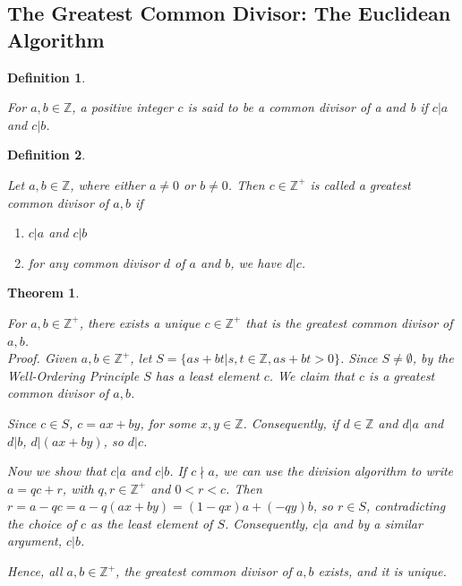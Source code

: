 \documentclass[12pt]{article}
\newtheorem{definition}{Definition} [section]
\newtheorem{theorem}{Theorem} [section]
\begin{document}
\subsection{The Greatest Common Divisor: The Euclidean Algorithm}
\begin{definition}
\begin{em}
For $a, b \in \mathbb{Z}$, a positive integer $c$ is said to be a \emph{common divisor of a and b} if $c|a$ and $c|b$.
\end{em}
\end{definition}
\begin{definition}
\begin{em}
Let $a, b \in \mathbb{Z}$, where either $a \neq 0$ or $b \neq 0$. Then $c \in \mathbb{Z}^+$ is called a \emph{greatest common divisor} of $a, b$ if
\begin{enumerate}
\item $c|a$ and $c|b$
\item for any common divisor $d$ of $a$ and $b$, we have $d|c$.
\end{enumerate}
\end{em}
\end{definition}
\begin{theorem}
\begin{em}
For $a, b \in \mathbb{Z}^+$, there exists a unique $c \in \mathbb{Z}^+$ that is \emph{the} greatest common divisor of $a, b$.\\
\emph{Proof.} Given $a, b \in \mathbb{Z}^+$, let $S = \{as + bt | s, t \in \mathbb{Z}, as + bt > 0\}$. Since $S \neq \emptyset$, by the Well-Ordering Principle $S$ has a least element $c$. We claim that $c$ is a greatest common divisor of $a, b$.

Since $c \in S$, $c = ax + by$, for some $x, y \in \mathbb{Z}$. Consequently, if $d \in \mathbb{Z}$ and $d|a$ and $d|b$, $d|(ax+by)$, so $d|c$.

Now we show that $c|a$ and $c|b$. If $c\nmid a$, we can use the division algorithm to write $a = qc + r$, with $q, r \in \mathbb{Z}^+$ and $0 < r < c$. Then $r = a - qc = a - q(ax + by) = (1 - qx)a + (-qy)b$, so $r \in S$, contradicting the choice of $c$ as the least element of $S$. Consequently, $c|a$ and by a similar argument, $c|b$.

Hence, all $a, b \in \mathbb{Z}^+$, the greatest common divisor of $a, b$ exists, and it is unique.
\end{em}
\end{theorem}
\end{document}
